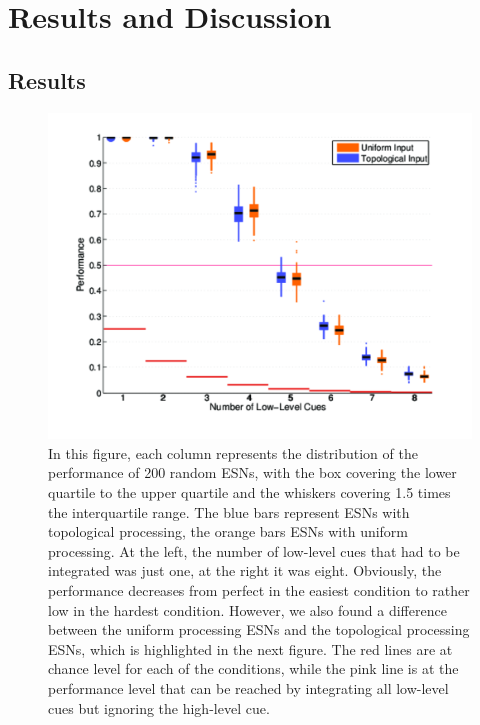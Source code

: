 \documentclass[10pt,a4paper]{report}
\begin{document}
\chapter{Results and Discussion}

\section{Results}

\begin{figure}[bthp]
\includegraphics[width=\textwidth]{figures/polboxchance.png}
\caption{In this figure, each column represents the distribution of the performance of 200 random ESNs, with the box covering the lower quartile to the upper quartile and the whiskers covering 1.5 times the interquartile range. The blue bars represent ESNs with topological processing, the orange bars ESNs with uniform processing. At the left, the number of low-level cues that had to be integrated was just one, at the right it was eight. Obviously, the performance decreases from perfect in the easiest condition to rather low in the hardest condition. However, we also found a difference between the uniform processing ESNs and the topological processing ESNs, which is highlighted in the next figure. The red lines are at chance level for each of the conditions, while the pink line is at the performance level that can be reached by integrating all low-level cues but ignoring the high-level cue.}
\label{policyabstraction}
\end{figure}
\end{document}

